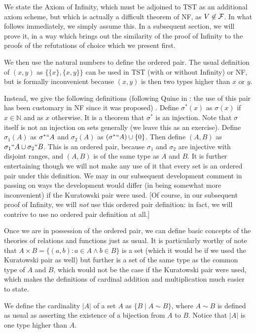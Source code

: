 \documentclass[12pt]{article}
\begin{document}
We state the Axiom of Infinity, which must be adjoined to TST as an additional axiom scheme, but which is actually a difficult theorem of NF, as $V \not\in \cal F$.  In what follows immediately, we simply assume this.  In a subsequent section, we will prove it, in a way which brings out the similarity of the proof of Infinity to the proofs of the refutations of choice which we present first.

We then use the natural numbers to define the ordered pair.  The usual definition of $(x,y)$ as $\{\{x\},\{x,y\}\}$ can be used in TST (with or without Infinity) or NF, but is formally inconvenient because $(x,y)$ is then two types higher than $x$ or $y$. 

Instead, we give the following definitions (following Quine in \cite{quinepair}:  the use of this pair has been customary in NF since it was proposed) .  Define $\sigma^*(x)$ as $\sigma(x)$ if $x \in \mathbb N$ and as $x$ otherwise.  It is a theorem that $\sigma^*$ is an injection.  Note that $\sigma$ itself is not an injection on sets generally (we leave this as an exercise).   Define $\sigma_1(A)$ as $\sigma^*``A$ and $\sigma_2(A)$ as $(\sigma^*``A) \cup \{0\}$.  Then define $(A,B)$ as $\sigma_1``A \cup \sigma_2``B$.  This is an ordered pair,
because $\sigma_1$ and $\sigma_2$ are injective with disjoint ranges, and $(A,B)$ is of the same type as $A$ and $B$.  It is further entertaining though we will not make any use of it that every set is an ordered pair under this definition.  We may in our subsequent development comment in passing on ways the development would differ (in being somewhat more inconvenient) if the Kuratowski pair were used.  [Of course, in our subsequent proof of Infinity, we will {\em not\/} use this ordered pair definition:  in fact, we will contrive to use no ordered pair definition at all.]

Once we are in possession of the ordered pair, we can define basic concepts of the theories of relations and functions just as usual.  It is particularly worthy of note that $A \times B = \{(a,b):a \in A \wedge b \in B\}$ is a set
(which it would be if we used the Kuratowski pair as well) but further is a set of the same type as the common type of $A$ and $B$, which would not be the case if the Kuratowski pair were used, which makes the definitions
of cardinal addition and multiplication much easier to state.

We define the cardinality $|A|$ of a set $A$ as $\{B\mid A \sim B\}$, where $A \sim B$ is defined as usual as asserting the existence of a bijection from $A$ to $B$.  Notice that $|A|$ is one type higher than $A$.
\end{document}
